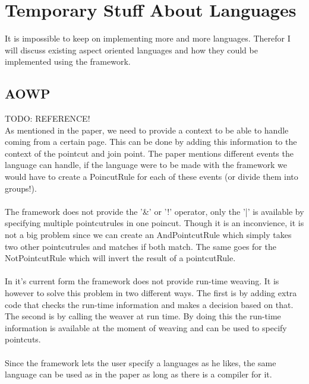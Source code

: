 \documentclass[a4paper]{report}
\begin{document}
\chapter{Temporary Stuff About Languages}
It is impossible to keep on implementing more and more languages. Therefor I will discuss existing aspect oriented languages and how they could be implemented using the framework.
\section{AOWP}


TODO: REFERENCE!\\
As mentioned in the paper, we need to provide a context to be able to handle coming from a certain page. This can be done by adding this information to the context of the pointcut and join point. The paper mentions different events the language can handle, if the language were to be made with the framework we would have to create a PoincutRule for each of these events (or divide them into groups!).\\
\\
The framework does not provide the '\&' or '!' operator, only the '|' is available by specifying multiple pointcutrules in one poincut. Though it is an inconvience, it is not a big problem since we can create an AndPointcutRule which simply takes two other pointcutrules and matches if both match. The same goes for the NotPointcutRule which will invert the result of a pointcutRule.\\
\\
In it's current form the framework does not provide run-time weaving. It is however to solve this problem in two different ways. The first is by adding extra code that checks the run-time information and makes a decision based on that. The second is by calling the weaver at run time.  By doing this the run-time information is available at the moment of weaving and can be used to specify pointcuts.\\
\\
Since the framework lets the user specify a languages as he likes, the same language can be used as in the paper as long as there is a compiler for it.
\end{document}
